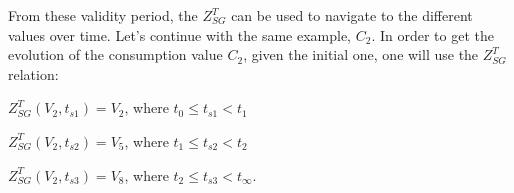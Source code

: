 From these validity period, the $Z^T_{SG}$ can be used to navigate to the different values over time.
Let's continue with the same example, $C_2$.
In order to get the evolution of the consumption value $C_2$, given the initial one, one will use the $Z^T_{SG}$ relation:
\begin{condItemize}
	\item $Z^T_{SG}(V_2, t_{s1}) = V_2$, where $t_0 \leqslant t_{s1} < t_1$
	\item $Z^T_{SG}(V_2, t_{s2}) = V_5$, where $t_1 \leqslant t_{s2} < t_2$
	\item $Z^T_{SG}(V_2, t_{s3}) = V_8$, where $t_2 \leqslant t_{s3} < t_\infty$.
\end{condItemize}



